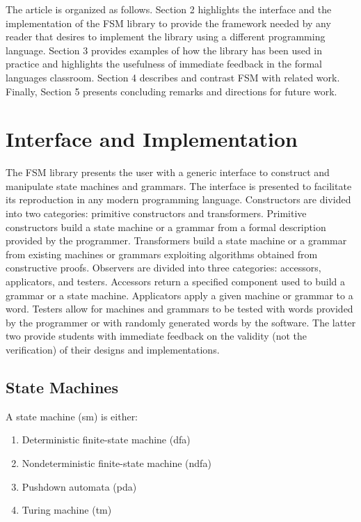 \documentclass{eptcs}
\begin{document}
The article is organized as follows. Section 2 highlights the interface and the implementation of the \textsf{FSM} library to provide the framework needed by any reader that desires to implement the library using a different programming language. Section 3 provides examples of how the library has been used in practice and highlights the usefulness of immediate feedback in the formal languages classroom. Section 4 describes and contrast \textsf{FSM} with related work. Finally, Section 5 presents concluding remarks and directions for future work.

\section{Interface and Implementation}
The \textsf{FSM} library presents the user with a generic interface to construct and manipulate state machines and grammars. The interface is presented to facilitate its reproduction in any modern programming language. Constructors are divided into two categories: primitive constructors and transformers. Primitive constructors build a state machine or a grammar from a formal description provided by the programmer. Transformers build a state machine or a grammar from existing machines or grammars exploiting algorithms obtained from constructive proofs. Observers are divided into three categories: accessors, applicators, and testers. Accessors return a specified component used to build a grammar or a state machine. Applicators apply a given machine or grammar to a word. Testers allow for machines and grammars to be tested with words provided by the programmer or with randomly generated words by the software. The latter two provide students with immediate feedback on the validity (not the verification) of their designs and implementations.

\subsection{State Machines}
A state machine (sm) is either:
 \begin{enumerate}
   \item Deterministic finite-state machine (\textsf{dfa})
   \item Nondeterministic finite-state machine (\textsf{ndfa})
   \item Pushdown automata (\textsf{pda})
   \item Turing machine (\textsf{tm})
 \end{enumerate}
\end{document}
